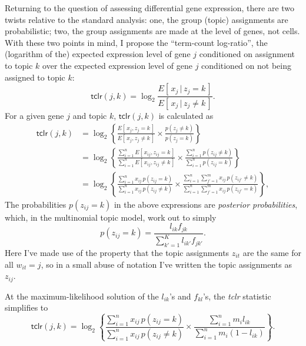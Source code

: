 \documentclass[final]{siamart171218}
\begin{document}
Returning to the question of assessing differential gene expression,
there are two twists relative to the standard analysis: one, the group
(topic) assignments are probabilistic; two, the group assignments are
made at the level of genes, not cells. With these two points in mind,
I propose the ``term-count log-ratio'', the (logarithm of the)
expected expression level of gene $j$ conditioned on assignment to
topic $k$ over the expected expression level of gene $j$ conditioned
on not being assigned to topic $k$:
\begin{equation}
\mathsf{tclr}(j,k) =
\log_2 \frac{E[\,x_j \,|\, z_j = k\,]}{E[\,x_j \,|\, z_j \neq k\,]}.
\end{equation}
For a given gene $j$ and topic $k$, $\mathsf{tclr}(j,k)$ is calculated
as
\begin{align}
\mathsf{tclr}(j,k) &=
\log_2 \left\{ \frac{E[\, x_j, z_j = k \,]}{E[\, x_j, z_j \neq k\,]} \times
\frac{p(z_j \neq k)}{p(z_j = k)} \right\} \nonumber \\
&= \log_2 \left\{ \frac{\sum_{i=1}^n E[\, x_{ij}, z_{ij} = k \,]}
                       {\sum_{i=1}^n E[\, x_{ij}, z_{ij} \neq k\,]} \times
                  \frac{\sum_{i=1}^n p(z_{ij} \neq k)}
                       {\sum_{i=1}^n p(z_{ij} = k)} \right\} \nonumber \\
&= \log_2 \left\{ \frac{\sum_{i=1}^n x_{ij} \, p(z_{ij} = k)}
                       {\sum_{i=1}^n x_{ij} \, p(z_{ij} \neq k)} \times
                  \frac{\sum_{i=1}^n \sum_{j'=1}^m x_{ij} \, p(z_{ij'} \neq k)}
                       {\sum_{i=1}^n \sum_{j'=1}^m x_{ij} \, p(z_{ij'} = k)}
                  \right\},
\end{align}
The probabilities $p(z_{ij} = k)$ in the above expressions are {\em
posterior probabilities}, which, in the multinomial topic model,
work out to simply
\begin{equation}
p(z_{ij} = k) = \frac{l_{ik} f_{jk}}{\sum_{k'=1}^K l_{ik'} f_{jk'}}.
\end{equation}
Here I've made use of the property that the topic assignments $z_{it}$
are the same for all $w_{it} = j$, so in a small abuse of notation
I've written the topic assignments as $z_{ij}$.

At the maximum-likelihood solution of the $l_{ik}$'s and $f_{kl}$'s,
the {\em tclr} statistic simplifies to
\begin{equation}
\mathsf{tclr}(j,k) = \log_2 \left\{ \frac{\sum_{i=1}^n x_{ij} \, p(z_{ij} = k)}
                       {\sum_{i=1}^n x_{ij} \, p(z_{ij} \neq k)} \times
                  \frac{\sum_{i=1}^n m_i l_{ik}}
                       {\sum_{i=1}^n m_i (1 - l_{ik})}
                  \right\}.
\end{equation}



\end{document}
